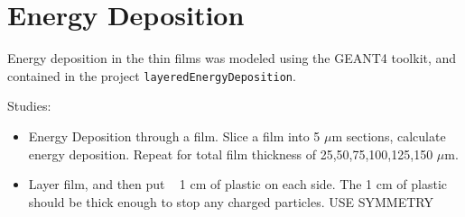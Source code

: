 \section{Energy Deposition}

Energy deposition in the thin films was modeled using the GEANT4 toolkit, and contained in the project \verb+layeredEnergyDeposition+.


Studies:
\begin{itemize}
    \item Energy Deposition through a film. Slice a film into 5 $\mu$m sections, calculate energy deposition. Repeat for total film thickness of 25,50,75,100,125,150 $\mu$m.
    \item Layer film, and then put ~ 1 cm of plastic on each side. The 1 cm of plastic should be thick enough to stop any charged particles. USE SYMMETRY
\end{itemize}

